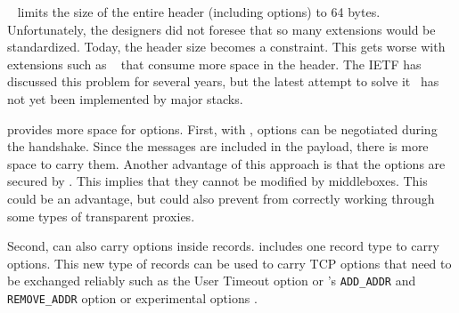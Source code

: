 
\tcp~\cite{rfc793} limits the size of the entire \tcp header (including options) to 64 bytes. Unfortunately, the \tcp designers did not foresee that so many \tcp extensions would be standardized. Today, the \tcp header size becomes a constraint.
This gets worse with extensions such as \mptcp~\cite{rfc6824} that consume more space in the \tcp header. The IETF has discussed this problem for several years, but the latest attempt to solve it~\cite{draft-ietf-tcpm-tcp-edo-10} has not yet been implemented by major \tcp stacks.

\tcpls provides more space for \tcp options. First, with \tcpls, \tcp
options can be negotiated during the \tls handshake. Since the \tls messages are
included in the \tcp payload, there is more space to carry them. Another
advantage of this approach is that the \tcp options are secured by \tls. This
implies that they cannot be modified by middleboxes. This could be an advantage,
but could also prevent \tcpls from correctly working through some types of
transparent \tcp proxies.

Second, \tcpls can also carry \tcp options inside \tls records. \tcpls includes
one record type to carry \tcp options. This new type of records can be used to carry TCP options that need to be exchanged reliably such as the \tcp User Timeout option \cite{rfc5482} or \mptcp's \texttt{ADD\_ADDR} and \texttt{REMOVE\_ADDR} option or experimental \tcp options \cite{rfc6994}.

